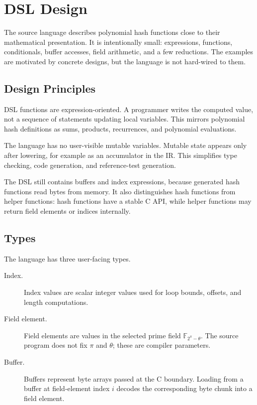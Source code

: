 \chapter{DSL Design}
\label{ch:dsl-design}

The source language describes polynomial hash functions close to their mathematical presentation. It is intentionally small: expressions, functions, conditionals, buffer accesses, field arithmetic, and a few reductions. The examples are motivated by concrete designs, but the language is not hard-wired to them.

\section{Design Principles}
\label{sec:dsl-principles}

DSL functions are expression-oriented. A programmer writes the computed value, not a sequence of statements updating local variables. This mirrors polynomial hash definitions as sums, products, recurrences, and polynomial evaluations.

The language has no user-visible mutable variables. Mutable state appears only after lowering, for example as an accumulator in the IR. This simplifies type checking, code generation, and reference-test generation.

The DSL still contains buffers and index expressions, because generated hash functions read bytes from memory. It also distinguishes hash functions from helper functions: hash functions have a stable C API, while helper functions may return field elements or indices internally.

\section{Types}
\label{sec:dsl-types}

The language has three user-facing types.

\begin{description}
    \item[Index.] Index values are scalar integer values used for loop bounds, offsets, and length computations.
    \item[Field element.] Field elements are values in the selected prime field \(\mathbb{F}_{2^\pi-\theta}\). The source program does not fix \(\pi\) and \(\theta\); these are compiler parameters.
    \item[Buffer.] Buffers represent byte arrays passed at the C boundary. Loading from a buffer at field-element index \(i\) decodes the corresponding byte chunk into a field element.
\end{description}

